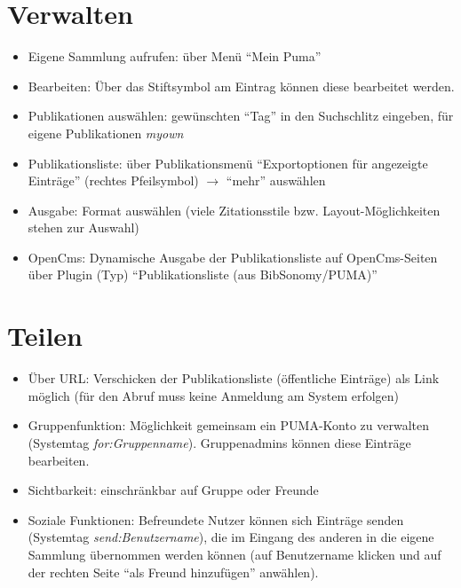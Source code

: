 \section{Verwalten}
\label{sec:verwalten}
\begin{itemize}
\item Eigene Sammlung aufrufen: über Menü \enquote{Mein Puma}
\item Bearbeiten: Über das Stiftsymbol am Eintrag können diese bearbeitet werden.
\item Publikationen auswählen: gewünschten \enquote{Tag} in den Suchschlitz eingeben, für eigene Publikationen \textit{myown}
\item Publikationsliste: über Publikationsmenü \enquote{Exportoptionen für angezeigte Einträge}  (rechtes Pfeilsymbol) $\to$ \enquote{mehr} auswählen
\item Ausgabe: Format auswählen (viele Zitationsstile bzw. Layout-Möglichkeiten stehen zur Auswahl)
\item OpenCms: Dynamische Ausgabe der Publikationsliste auf OpenCms-Seiten über Plugin (Typ) \enquote{Publikationsliste (aus BibSonomy/PUMA)}
\end{itemize}

\section{Teilen}
\label{sec:teilen}
\begin{itemize}
\item Über URL: Verschicken der Publikationsliste (öffentliche Einträge) als Link möglich (für den Abruf muss keine Anmeldung am System erfolgen)
\item Gruppenfunktion: Möglichkeit gemeinsam ein PUMA-Konto zu verwalten (Systemtag \textit{for:Gruppenname}). Gruppenadmins können diese Einträge bearbeiten.
\item Sichtbarkeit: einschränkbar auf Gruppe oder Freunde
\item Soziale Funktionen: Befreundete Nutzer können sich Einträge senden (Systemtag \textit{send:Benutzername}), die im Eingang des anderen in die eigene Sammlung übernommen werden können (auf Benutzername klicken und auf der rechten Seite \enquote{als Freund hinzufügen} anwählen).
\end{itemize}
\newpage
